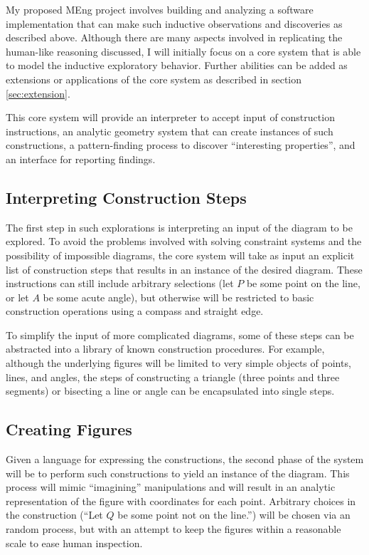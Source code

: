 \documentclass[10pt]{article}
\begin{document}
My proposed MEng project involves building and analyzing a software
implementation that can make such inductive observations and
discoveries as described above.  Although there are many aspects
involved in replicating the human-like reasoning discussed, I will
initially focus on a core system that is able to model the inductive
exploratory behavior.  Further abilities can be added as extensions or
applications of the core system as described in section
\ref{sec:extension}.

This core system will provide an interpreter to accept input of
construction instructions, an analytic geometry system that can create
instances of such constructions, a pattern-finding process to discover
``interesting properties'', and an interface for reporting findings.

\subsection{Interpreting Construction Steps}

The first step in such explorations is interpreting an input of the
diagram to be explored.  To avoid the problems involved with solving
constraint systems and the possibility of impossible diagrams, the
core system will take as input an explicit list of construction steps
that results in an instance of the desired diagram.  These
instructions can still include arbitrary selections (let $P$ be some
point on the line, or let $A$ be some acute angle), but otherwise will
be restricted to basic construction operations using a compass and
straight edge.

To simplify the input of more complicated diagrams, some of these
steps can be abstracted into a library of known construction
procedures.  For example, although the underlying figures will be
limited to very simple objects of points, lines, and angles, the steps
of constructing a triangle (three points and three segments) or
bisecting a line or angle can be encapsulated into single steps.

\subsection{Creating Figures}

Given a language for expressing the constructions, the second phase of
the system will be to perform such constructions to yield an instance
of the diagram.  This process will mimic ``imagining'' manipulations
and will result in an analytic representation of the figure with
coordinates for each point.  Arbitrary choices in the construction
(``Let $Q$ be some point not on the line.'') will be chosen via an
random process, but with an attempt to keep the figures within a
reasonable scale to ease human inspection.
\end{document}
